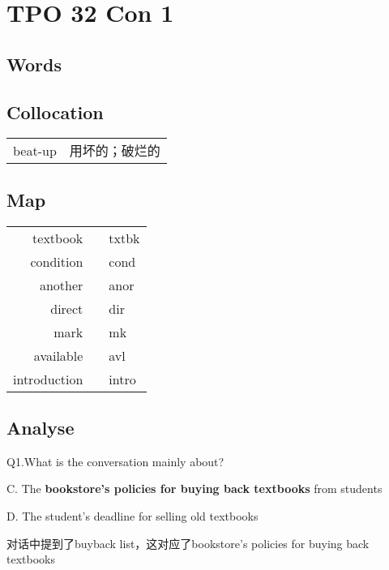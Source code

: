 \section{TPO 32 Con 1}

\subsection{Words}

\subsection{Collocation}

\begin{tabular}{ll}
    beat-up & 用坏的；破烂的 \\
\end{tabular}

\subsection{Map}

\begin{tabular}{rc@{\quad$\to$\quad}l}
    textbook     &  & txtbk \\
    condition    &  & cond  \\
    another      &  & anor  \\
    direct       &  & dir   \\
    mark         &  & mk    \\
    available    &  & avl   \\
    introduction &  & intro \\
\end{tabular}

\subsection{Analyse}

\begin{blk}
    \begin{qst}
        Q1.What is the conversation mainly about?
    \end{qst}

    \begin{chc}
        C. The \textbf{bookstore’s policies for buying back textbooks} from students

        D. The student’s deadline for selling old textbooks
    \end{chc}

    \begin{nlz}
        对话中提到了buyback list，这对应了bookstore’s policies for buying back textbooks
    \end{nlz}
\end{blk}

\newpage
